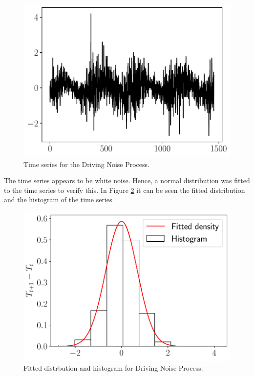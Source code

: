 \documentclass[11pt]{article}
\theoremstyle{definition}
\theoremstyle{remark}
\theoremstyle{remark}
\begin{document}
\begin{figure}
  \centering
  \includegraphics[scale=.5]{diffs_temps.pdf}
  \caption{Time series for the Driving Noise Process.}
  \label{fig:diff}
\end{figure}

The time series appears to be white noise. Hence, a normal
distribution was fitted to the time series to verify this. In Figure
\ref{fig:wn} it can be seen the fitted distribution and the histogram
of the time series.

\begin{figure}
  \centering
  \includegraphics[scale=.5]{hist_diffs_temps.pdf}
  \caption{Fitted distrbution and histogram for Driving Noise Process.}
  \label{fig:wn}
\end{figure}
\end{document}
